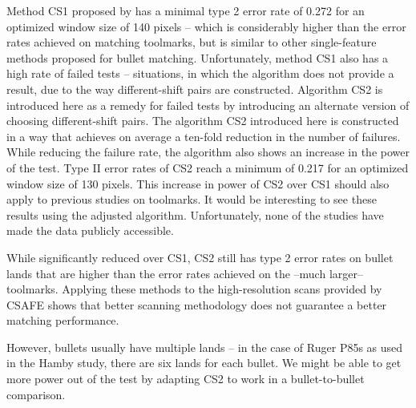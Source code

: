 \documentclass[12pt]{article}
\begin{document}
Method CS1 proposed by \citet{hadler} has a minimal type 2 error rate of
0.272 for an optimized window size of 140 pixels -- which is
considerably higher than the error rates achieved on matching toolmarks,
but is similar to other single-feature methods proposed for bullet
matching. Unfortunately, method CS1 also has a high rate of failed tests
-- situations, in which the algorithm does not provide a result, due to
the way different-shift pairs are constructed. Algorithm CS2 is
introduced here as a remedy for failed tests by introducing an alternate
version of choosing different-shift pairs. The algorithm CS2 introduced
here is constructed in a way that achieves on average a ten-fold
reduction in the number of failures. While reducing the failure rate,
the algorithm also shows an increase in the power of the test. Type II
error rates of CS2 reach a minimum of 0.217 for an optimized window size
of 130 pixels. This increase in power of CS2 over CS1 should also apply
to previous studies on toolmarks. It would be interesting to see these
results using the adjusted algorithm. Unfortunately, none of the studies
have made the data publicly accessible.

While significantly reduced over CS1, CS2 still has type 2 error rates
on bullet lands that are higher than the error rates achieved on the
--much larger-- toolmarks. Applying these methods to the high-resolution
scans provided by CSAFE shows that better scanning methodology does not
guarantee a better matching performance.

However, bullets usually have multiple lands -- in the case of Ruger
P85s as used in the Hamby study, there are six lands for each bullet. We
might be able to get more power out of the test by adapting CS2 to work
in a bullet-to-bullet comparison.
\end{document}
